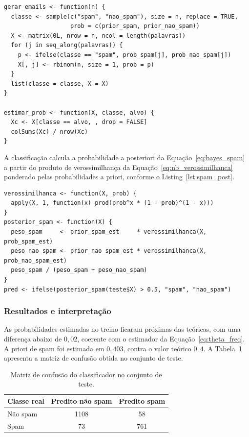 \begin{lstlisting}[caption={Geração das mensagens e estimação das probabilidades.}, label={lst:spam_gerar}]
gerar_emails <- function(n) {
  classe <- sample(c("spam", "nao_spam"), size = n, replace = TRUE,
                   prob = c(prior_spam, prior_nao_spam))
  X <- matrix(0L, nrow = n, ncol = length(palavras))
  for (j in seq_along(palavras)) {
    p <- ifelse(classe == "spam", prob_spam[j], prob_nao_spam[j])
    X[, j] <- rbinom(n, size = 1, prob = p)
  }
  list(classe = classe, X = X)
}

estimar_prob <- function(X, classe, alvo) {
  Xc <- X[classe == alvo, , drop = FALSE]
  colSums(Xc) / nrow(Xc)
}
\end{lstlisting}

A classificação calcula a probabilidade a posteriori da
Equação~\ref{eq:bayes_spam} a partir do produto de verossimilhança da
Equação~\ref{eq:nb_verossimilhanca} ponderado pelas probabilidades a priori,
conforme o Listing~\ref{lst:spam_post}.

\begin{lstlisting}[caption={Probabilidade a posteriori e classificação.}, label={lst:spam_post}]
verossimilhanca <- function(X, prob) {
  apply(X, 1, function(x) prod(prob^x * (1 - prob)^(1 - x)))
}
posterior_spam <- function(X) {
  peso_spam     <- prior_spam_est     * verossimilhanca(X, prob_spam_est)
  peso_nao_spam <- prior_nao_spam_est * verossimilhanca(X, prob_nao_spam_est)
  peso_spam / (peso_spam + peso_nao_spam)
}
pred <- ifelse(posterior_spam(teste$X) > 0.5, "spam", "nao_spam")
\end{lstlisting}

\subsubsection{Resultados e interpretação}

As probabilidades estimadas no treino ficaram próximas das teóricas, com uma
diferença abaixo de $0{,}02$, coerente com o estimador
da Equação~\ref{eq:theta_freq}. A priori de spam foi estimada em $0{,}403$, contra o
valor teórico $0{,}4$. A Tabela~\ref{tab:spam_conf} apresenta a matriz de
confusão obtida no conjunto de teste.

\begin{table}[H]
	\centering
	\caption{Matriz de confusão do classificador no conjunto de teste.}
	\begin{tabular}{lcc}
		\toprule
		Classe real & Predito não spam & Predito spam \\
		\midrule
		Não spam & 1108 & 58 \\
		Spam     & 73   & 761 \\
		\bottomrule
	\end{tabular}
	\label{tab:spam_conf}
\end{table}

